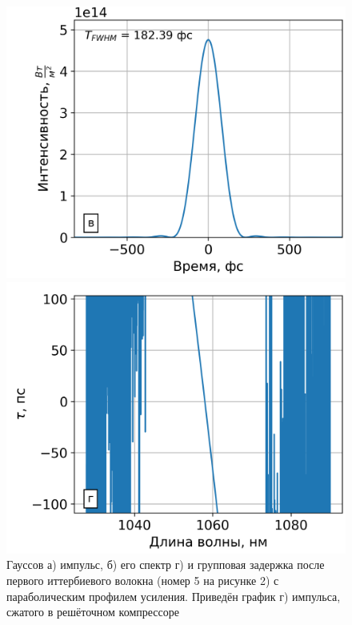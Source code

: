 \documentclass[12pt]{article}
\begin{document}
\begin{figure}[h!]
  \vspace{}

  \begin{minipage}[b]{0.5\textwidth}
    \includegraphics[width=\linewidth]{Images/Gauss Pulse Parabolic Profile/После компрессора/8 элемент gamma=49.49401 l_g=0.36732 сжатие}
  \end{minipage}%
  \begin{minipage}[b]{0.5\textwidth}
    \includegraphics[width=\linewidth]{Images/Gauss Pulse Parabolic Profile/Импульс и спектр/!8. Yb3+ 6_125, 0.9m_time_delay}
  \end{minipage}

  \caption{Гауссов а) импульс, б) его спектр г) и групповая задержка после первого иттербиевого волокна (номер 5 на
  рисунке 2) с параболическим профилем усиления. Приведён график г) импульса, сжатого в решёточном компрессоре}
  \label{fig:both}
\end{figure}
\end{document}
